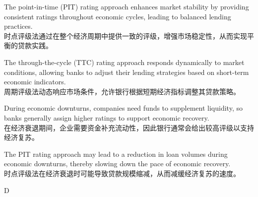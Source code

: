 \documentclass{article}
\begin{document}
\begin{choices}
    \item The point-in-time (PIT) rating approach enhances market stability by providing consistent ratings throughout economic cycles, leading to balanced lending practices.\\
    时点评级法通过在整个经济周期中提供一致的评级，增强市场稳定性，从而实现平衡的贷款实践。
    
    \item The through-the-cycle (TTC) rating approach responds dynamically to market conditions, allowing banks to adjust their lending strategies based on short-term economic indicators.\\
    周期评级法动态响应市场条件，允许银行根据短期经济指标调整其贷款策略。
    
    \item During economic downturns, companies need funds to supplement liquidity, so banks generally assign higher ratings to support economic recovery.\\
    在经济衰退期间，企业需要资金补充流动性，因此银行通常会给出较高评级以支持经济复苏。
    
    \item The PIT rating approach may lead to a reduction in loan volumes during economic downturns, thereby slowing down the pace of economic recovery.\\
    时点评级法在经济衰退时可能导致贷款规模缩减，从而减缓经济复苏的速度。
\end{choices}

\begin{correctanswer}
    D
\end{correctanswer}
\end{document}
